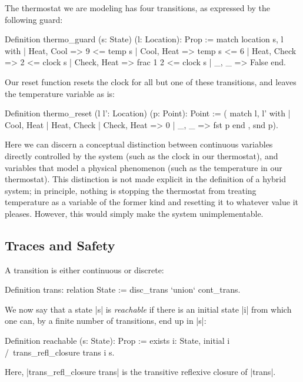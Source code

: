 \documentclass[runningheads]{llncs}
\begin{document}
The thermostat we are modeling has four transitions, as expressed by the following guard:

\begin{code}
Definition thermo_guard (s: State) (l: Location): Prop :=
  match location s, l with
  | Heat, Cool => 9 <= temp s
  | Cool, Heat => temp s <= 6
  | Heat, Check => 2 <= clock s
  | Check, Heat => frac 1 2 <= clock s
  | _, _ => False
  end.
\end{code}

Our reset function resets the clock for all but one of these transitions, and leaves the temperature variable as is:

\begin{code}
Definition thermo_reset (l l': Location) (p: Point): Point :=
  ( match l, l' with
    | Cool, Heat | Heat, Check | Check, Heat => 0
    | _, _ => fst p
    end
  , snd p).
\end{code}
Here we can discern a conceptual distinction between continuous variables directly controlled by the system (such as the clock in our thermostat), and variables that model a physical phenomenon (such as the temperature in our thermostat). This distinction is not made explicit in the definition of a hybrid system; in principle, nothing is stopping the thermostat from treating temperature as a variable of the former kind and resetting it to whatever value it pleases. However, this would simply make the system unimplementable.

\subsection{Traces and Safety}

A transition is either continuous or discrete:
\begin{code}
  Definition trans: relation State := disc_trans `union` cont_trans.
\end{code}

We now say that a state |s| is \emph{reachable} if there is an initial state |i| from which one can, by a finite number of transitions, end up in |s|:
\begin{code}
  Definition reachable (s: State): Prop :=
    exists i: State, initial i /\ trans_refl_closure trans i s.
\end{code}
Here, |trans_refl_closure trans| is the transitive reflexive closure of |trans|.
\end{document}

